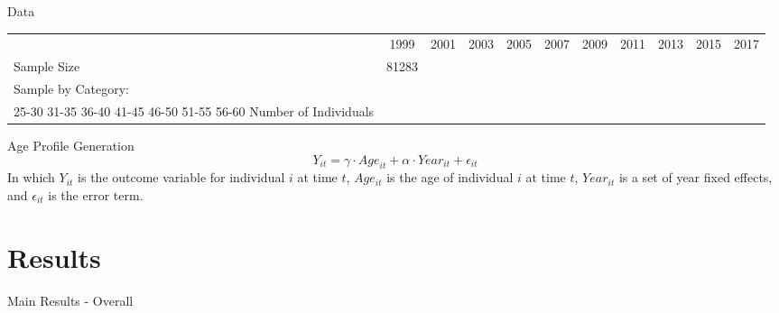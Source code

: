 \documentclass{beamer}
\begin{document}
\begin{frame}{Data}
  \begin{tabular}{||l|c|c|c|c|c||}
    & 1999 & 2001 & 2003 & 2005 & 2007 & 2009 & 2011 & 2013 & 2015 & 2017 \\
    Sample Size & 81283 &  & & & & & & & & & \\
    Sample by Category: & & & & & & & & \\
    25-30
    31-35
    36-40
    41-45
    46-50
    51-55
    56-60
    Number of Individuals
  \end{tabular}
\end{frame}

\begin{frame}{Age Profile Generation}
  \begin{equation}
    Y_{it} = \gamma\cdot{Age}_{it} + \alpha\cdot{Year}_{it} + \epsilon_{it}
  \end{equation}
  In which $Y_{it}$ is the outcome variable for individual $i$ at time $t$,
  $Age_{it}$ is the age of individual $i$ at time $t$,
  $Year_{it}$ is a set of year fixed effects, and $\epsilon_{it}$ is the error term.
\end{frame}

\section{Results}

\begin{frame}{Main Results - Overall}
  \begin{figure}
    \centering
  \end{figure}
\end{frame}
\begin{frame}
  \begin{figure}
  \end{figure}
\end{frame}
\begin{frame}
  \begin{figure}
  \end{figure}
\end{frame}
\end{document}
